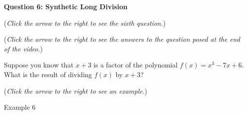 \documentclass{ximera}
\begin{document}
\textbf{Question 6: Synthetic Long Division}
\begin{question}
\begin{flushright}
{\color{blue}(\emph{Click the arrow to the right to see the sixth question.})}
\end{flushright}
\begin{center}
\begin{expandable}
{\color{blue}(\emph{Click the arrow to the right to see the answers 
to the question posed at the end of the video.})}
\begin{expandable}
Suppose you know that $x+3$ is a factor of the polynomial $f(x) = x^3 - 7x + 6$. What is the result of dividing $f(x)$ by $x+3$?
\begin{multipleChoice}
\end{multipleChoice}
\begin{flushright}
{\color{blue}(\emph{Click the arrow to the right to see an example.})}
\end{flushright}
\begin{expandable}
Example 6
\end{expandable}
\end{expandable}
\end{expandable}
\end{center}
\end{question}
\end{document}
